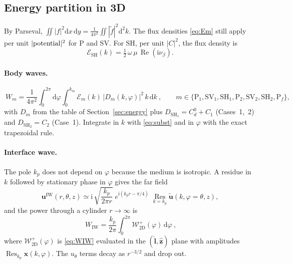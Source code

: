 \documentclass[11pt,a4paper]{article}
\newcommand{\ii}{\mathrm{i}}
\newcommand{\dd}{\mathrm{d}}
\newcommand{\Res}{\operatorname*{Res}}
\newcommand{\RE}{\operatorname{Re}}
\begin{document}
\subsection{Energy partition in 3D}

By Parseval, $\iint|f|^2\dd x\,\dd y=\frac{1}{4\pi^2}\iint|\tilde f|^2\dd^2k$. The flux densities
\eqref{eq:Em} still apply per unit $|{\rm potential}|^2$ for P and SV. For SH, per unit
$|C|^2$, the flux density is
\begin{equation}
  \mathcal E_{\mathrm{SH}}(k)=\tfrac12\,\omega\,\mu\,\RE(\ii\nu_\beta).
\end{equation}

\paragraph{Body waves.}
\begin{equation}
  \boxed{\ W_m=\frac{1}{4\pi^2}\int_0^{2\pi}\!\!\dd\varphi\int_0^{k_m}\mathcal E_m(k)\,
  \bigl|D_m(k,\varphi)\bigr|^2\,k\,\dd k\ },
  \qquad m\in\{\mathrm P_1,\mathrm{SV}_1,\mathrm{SH}_1,\mathrm P_2,\mathrm{SV}_2,\mathrm{SH}_2,\mathrm P_f\},
  \label{eq:Wbody3}
\end{equation}
with $D_m$ from the table of Section~\ref{sec:energy} plus
$D_{\mathrm{SH}_1}=C_d^0+C_1$ (Cases~1,~2) and $D_{\mathrm{SH}_2}=C_2$ (Case~1).
Integrate in $k$ with \eqref{eq:subst} and in $\varphi$ with the exact trapezoidal rule.

\paragraph{Interface wave.} The pole $k_p$ does not depend on $\varphi$ because the medium is isotropic.
A residue in $k$ followed by stationary phase in $\varphi$ gives the far field
\begin{equation}
  \mathbf u^{\mathrm{IW}}(r,\theta,z)\simeq
  \ii\,\sqrt{\frac{k_p}{2\pi r}}\;e^{\ii(k_pr-\pi/4)}\;
  \Res_{k=k_p}\tilde{\mathbf u}(k,\varphi=\theta,z),
\end{equation}
and the power through a cylinder $r\to\infty$ is
\begin{equation}
  \boxed{\ W_{\mathrm{IW}}=\frac{k_p}{2\pi}\int_0^{2\pi}\mathcal W^{+}_{\mathrm{2D}}(\varphi)\,\dd\varphi\ },
  \label{eq:WIW3}
\end{equation}
where $\mathcal W^{+}_{\mathrm{2D}}(\varphi)$ is \eqref{eq:WIW} evaluated in the $(\hat{\mathbf l},\hat{\mathbf z})$
plane with amplitudes $\Res_{k_p}\mathbf x(k,\varphi)$. The $u_\theta$ terms decay as $r^{-3/2}$ and
drop out.
\end{document}
